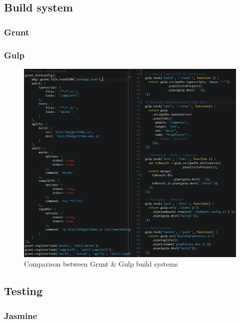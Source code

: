 	\subsection{Build system}
	\label{ssect:build_system}
	
		\subsubsection{Grunt}
		\label{sssect:grunt}
		
		\subsubsection{Gulp}
		\label{sssect:gulp}
		
		
		\begin{figure}[ht]
			\label{fig_grunt_gulp}
			\centering
			\hspace*{-1.4cm}
			\includegraphics[width=1.2\textwidth]{figures/grunt_gulp_comparison}
			\caption{Comparison between Grunt \& Gulp build systems}
		\end{figure}
		
	
	\subsection{Testing}
	\label{ssect:testing}
	
		\subsubsection{Jasmine}
		\label{sssect:jasmine}
		
